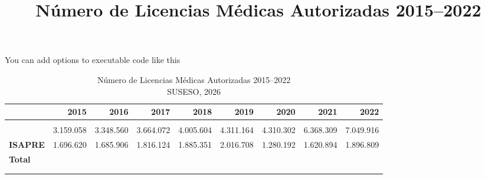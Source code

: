 \documentclass[
  letterpaper,
  DIV=11,
  numbers=noendperiod]{scrartcl}
\title{Número de Licencias Médicas Autorizadas 2015--2022}
\author{}
\date{}
\begin{document}
\maketitle


You can add options to executable code like this

\begin{table}
\caption*{
{\fontsize{20}{25}\selectfont  Número de Licencias Médicas Autorizadas 2015–2022\fontsize{12}{15}\selectfont } \\ 
{\fontsize{14}{17}\selectfont  SUSESO, 2026\fontsize{12}{15}\selectfont }
} 
\fontsize{12.0pt}{14.0pt}\selectfont
\begin{tabular*}{\linewidth}{@{\extracolsep{\fill}}l|rrrrrrrr}
\toprule
 & {\bfseries 2015} & {\bfseries 2016} & {\bfseries 2017} & {\bfseries 2018} & {\bfseries 2019} & {\bfseries 2020} & {\bfseries 2021} & {\bfseries 2022} \\ 
\midrule\addlinespace[2.5pt]
\multicolumn{9}{l}{{\bfseries Licencias médicas autorizadas según seguro de salud}} \\[2.5pt] 
\midrule\addlinespace[2.5pt]
{\bfseries FONASA} & 3.159.058 & 3.348.560 & 3.664.072 & 4.005.604 & 4.311.164 & 4.310.302 & 6.368.309 & 7.049.916 \\ 
{\bfseries ISAPRE} & 1.696.620 & 1.685.906 & 1.816.124 & 1.885.351 & 2.016.708 & 1.280.192 & 1.620.894 & 1.896.809 \\ 
{\bfseries Total} & {\bfseries \cellcolor[HTML]{D9D9D9}{4.855.678}} & {\bfseries \cellcolor[HTML]{D9D9D9}{5.034.466}} & {\bfseries \cellcolor[HTML]{D9D9D9}{5.480.196}} & {\bfseries \cellcolor[HTML]{D9D9D9}{5.890.955}} & {\bfseries \cellcolor[HTML]{D9D9D9}{6.327.872}} & {\bfseries \cellcolor[HTML]{D9D9D9}{5.590.494}} & {\bfseries \cellcolor[HTML]{D9D9D9}{7.989.203}} & {\bfseries \cellcolor[HTML]{D9D9D9}{8.946.725}} \\ 
\midrule\addlinespace[2.5pt]
\multicolumn{9}{l}{{\bfseries Licencias médicas autorizadas según sexo y seguro de salud}} \\[2.5pt] 
\midrule\addlinespace[2.5pt]
{\bfseries \fontsize{0}{0}\selectfont \textcolor[HTML]{rgba(255,255,255,0)}{​}} & {\fontsize{0}{0}\selectfont \textcolor[HTML]{rgba(255,255,255,0)}{}} & {\fontsize{0}{0}\selectfont \textcolor[HTML]{rgba(255,255,255,0)}{}} & {\fontsize{0}{0}\selectfont \textcolor[HTML]{rgba(255,255,255,0)}{}} & {\fontsize{0}{0}\selectfont \textcolor[HTML]{rgba(255,255,255,0)}{}} & {\fontsize{0}{0}\selectfont \textcolor[HTML]{rgba(255,255,255,0)}{}} & {\fontsize{0}{0}\selectfont \textcolor[HTML]{rgba(255,255,255,0)}{}} & {\fontsize{0}{0}\selectfont \textcolor[HTML]{rgba(255,255,255,0)}{}} & {\fontsize{0}{0}\selectfont \textcolor[HTML]{rgba(255,255,255,0)}{}} \\ 

\end{tabular*}
\end{table}
\end{document}
